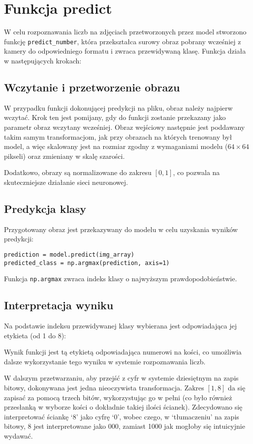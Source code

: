 \section{Funkcja predict}

W celu rozpoznawania liczb na zdjęciach przetworzonych przez model stworzono funkcję \texttt{predict\_number},
która przekształca surowy obraz pobrany wcześniej z kamery do odpowiedniego formatu i zwraca przewidywaną klasę.
Funkcja działa w następujących krokach:

\subsection{Wczytanie i przetworzenie obrazu}

W przypadku funkcji dokonującej predykcji na pliku, obraz należy najpierw wczytać.
Krok ten jest pomijany, gdy do funkcji zostanie przekazany jako parametr obraz wczytany wcześniej.
Obraz wejściowy następnie jest poddawany takim samym transformacjom, jak przy obrazach na których trenowany był model,
a więc skalowany jest na rozmiar zgodny z wymaganiami modelu ($64 \times 64$ pikseli) oraz zmieniany w skalę szarości.

Dodatkowo, obrazy są normalizowane do zakresu $[0, 1]$, co pozwala na skuteczniejsze działanie sieci neuronowej.

\subsection{Predykcja klasy}

Przygotowany obraz jest przekazywany do modelu w celu uzyskania wyników predykcji:

\begin{verbatim}
prediction = model.predict(img_array)
predicted_class = np.argmax(prediction, axis=1)
\end{verbatim}

Funkcja \texttt{np.argmax} zwraca indeks klasy o najwyższym prawdopodobieństwie.

\subsection{Interpretacja wyniku}

Na podstawie indeksu przewidywanej klasy wybierana jest odpowiadająca jej etykieta (od 1 do 8):

Wynik funkcji jest tą etykietą odpowiadająca numerowi na kości,
co umożliwia dalsze wykorzystanie tego wyniku w systemie rozpoznawania liczb.

W dalszym przetwarzaniu, aby przejść z cyfr w systemie dziesiętnym na zapis bitowy, dokonywana jest jedna nieoczywista transformacja.
Zakres $[1, 8]$ da się zapisać za pomocą trzech bitów, wykorzystując go w pełni (co było również przesłanką w wyborze kości o dokładnie takiej ilości ścianek).
Zdecydowano się interpretować ściankę `8' jako cyfrę `0', wobec czego, w `tłumaczeniu' na zapis bitowy, 8 jest interpretowane jako 000, zamiast 1000 jak mogłoby się intuicyjnie wydawać.

